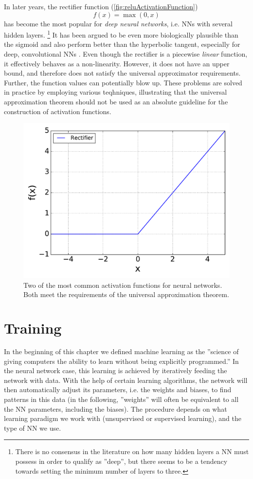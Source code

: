 \documentclass[twoside,english]{uiofysmaster}
\begin{document}
In later years, the rectifier function (\autoref{fig:reluActivationFunction})
\begin{equation}
 f(x) = \max(0,x)
\end{equation}
has become the most popular \cite{LeCun15} for \textit{deep neural networks}, i.e. NNs with several hidden layers.
\footnote{There is no consensus in the literature on how many hidden layers a NN must possess in order to qualify as ''deep'', 
but there seems to be a tendency towards setting the minimum number of layers to three.}
It has been argued to be even more biologically plausible than the sigmoid and also perform better
than the hyperbolic tangent, especially for deep, convolutional NNs \cite{Glorot11}. Even though the rectifier is a
piecewise \textit{linear} function, it effectively behaves as a non-linearity. However, it does not have an upper bound, and
therefore does not satisfy the universal approximator requirements. Further, the function values can potentially blow up. 
These problems are solved in practice by employing various teqhniques, illustrating that the universal approximation theorem
should not be used as an absolute guideline for the construction of activation functions. 
\begin{figure}
\begin{center}
 \includegraphics[width = 0.7\linewidth]{Figures/Theory/reluActivation.pdf}
  \caption{Two of the most common activation functions for neural networks. Both meet the requirements
	   of the universal approximation theorem.}
  \label{fig:reluActivationFunction}
  \end{center}
\end{figure}


\section{Training} \label{sec:training}
In the beginning of this chapter we defined machine learning as the ''science of giving computers the ability to learn without
being explicitly programmed.'' In the neural network case, this learning is achieved by iteratively feeding the network with data. 
With the help of certain learning algorithms, the network will then automatically adjust its parameters, i.e. the weights and biases, 
to find patterns in this data (in the following, ''weights'' will often be equivalent to all 
the NN parameters, including the biases).
The procedure depends on what learning paradigm we work with
(unsupervised or supervised learning), and the type of NN we use. 
\end{document}
